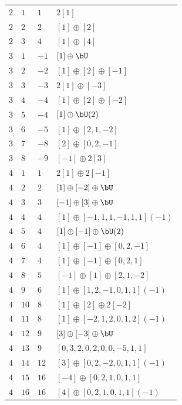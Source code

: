 \begin{center}
\begin{longtable}{llll}
 \(2\) & \(1\) & \(1\) & \(2 [1]\) \\
 \(2\) & \(2\) & \(2\) & \([1] \oplus [2]\) \\
 \(2\) & \(3\) & \(4\) & \([1] \oplus [4]\) \\
\midrule
 \(3\) & \(1\) & \(-1\) & \([1] \oplus \bU\) \\
 \(3\) & \(2\) & \(-2\) & \([1] \oplus [2] \oplus [-1]\) \\
 \(3\) & \(3\) & \(-3\) & \(2 [1] \oplus [-3]\) \\
 \(3\) & \(4\) & \(-4\) & \([1] \oplus [2] \oplus [-2]\) \\
 \(3\) & \(5\) & \(-4\) & \([1] \oplus \bU(2)\) \\
 \(3\) & \(6\) & \(-5\) & \([1] \oplus [2, 1, -2]\) \\
 \(3\) & \(7\) & \(-8\) & \([2] \oplus [0, 2, -1]\) \\
 \(3\) & \(8\) & \(-9\) & \([-1] \oplus 2 [3]\) \\
\midrule
 \(4\) & \(1\) & \(1\) & \(2 [1] \oplus 2 [-1]\) \\
 \(4\) & \(2\) & \(2\) & \([1] \oplus [-2] \oplus \bU\) \\
 \(4\) & \(3\) & \(3\) & \([-1] \oplus [3] \oplus \bU\) \\
 \(4\) & \(4\) & \(4\) & \([1] \oplus [-1, 1, 1, -1, 1, 1](-1)\) \\
 \(4\) & \(5\) & \(4\) & \([1] \oplus [-1] \oplus \bU(2)\) \\
 \(4\) & \(6\) & \(4\) & \([1] \oplus [-1] \oplus [0, 2, -1]\) \\
 \(4\) & \(7\) & \(4\) & \([1] \oplus [-1] \oplus [0, 2, 1]\) \\
 \(4\) & \(8\) & \(5\) & \([-1] \oplus [1] \oplus [2, 1, -2]\) \\
 \(4\) & \(9\) & \(6\) & \([1] \oplus [1, 2, -1, 0, 1, 1](-1)\) \\
 \(4\) & \(10\) & \(8\) & \([1] \oplus [2] \oplus 2 [-2]\) \\
 \(4\) & \(11\) & \(8\) & \([1] \oplus [-2, 1, 2, 0, 1, 2](-1)\) \\
 \(4\) & \(12\) & \(9\) & \([3] \oplus [-3] \oplus \bU\) \\
 \(4\) & \(13\) & \(9\) & \([0, 3, 2, 0, 2, 0, 0, -5, 1, 1]\) \\
 \(4\) & \(14\) & \(12\) & \([3] \oplus [0, 2, -2, 0, 1, 1](-1)\) \\
 \(4\) & \(15\) & \(16\) & \([-4] \oplus [0, 2, 1, 0, 1, 1]\) \\
 \(4\) & \(16\) & \(16\) & \([4] \oplus [0, 2, 1, 0, 1, 1](-1)\) \\

\end{longtable}
\end{center}
